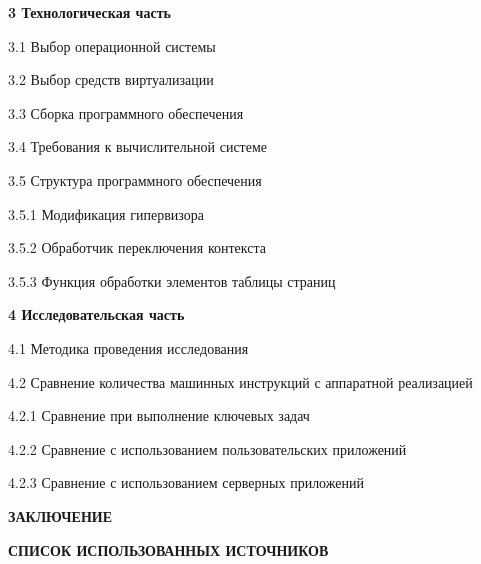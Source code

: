 \textbf{3 Технологическая часть}

3.1 Выбор операционной системы

3.2 Выбор средств виртуализации

3.3 Сборка программного обеспечения

3.4 Требования к вычислительной системе

3.5 Структура программного обеспечения

3.5.1 Модификация гипервизора

3.5.2 Обработчик переключения контекста

3.5.3 Функция обработки элементов таблицы страниц

\textbf{4 Исследовательская часть}

4.1 Методика проведения исследования

4.2 Сравнение количества машинных инструкций с аппаратной реализацией

4.2.1 Сравнение при выполнение ключевых задач

4.2.2 Сравнение с использованием пользовательских приложений

4.2.3 Сравнение с использованием серверных приложений\newline

\textbf{ЗАКЛЮЧЕНИЕ}

\textbf{СПИСОК ИСПОЛЬЗОВАННЫХ ИСТОЧНИКОВ}

\pagebreak
